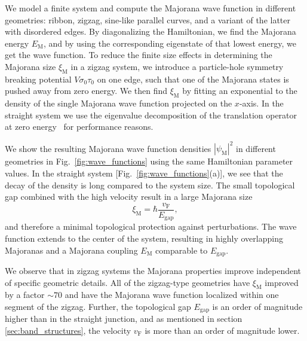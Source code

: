 \documentclass[english, twocolumn, 10pt, aps, superscriptaddress, floatfix, prb, citeautoscript]{revtex4-1}
\renewcommand{\comment}[2]{#2}
\begin{document}
\comment{We calculate the wave functions and find the Majorana lengths by fitting an exponential.}
We model a finite system and compute the Majorana wave function in different geometries: ribbon, zigzag, sine-like parallel curves, and a variant of the latter with disordered edges.
By diagonalizing the Hamiltonian, we find the Majorana energy $E_\textrm{M}$, and by using the corresponding eigenstate of that lowest energy, we get the wave function.
To reduce the finite size effects in determining the Majorana size $\xi_\textrm{M}$ in a zigzag system, we introduce a particle-hole symmetry breaking potential $V \sigma_0 \tau_0$ on one edge, such that one of the Majorana states is pushed away from zero energy.
We then find $\xi_\textrm{M}$ by fitting an exponential to the density of the single Majorana wave function projected on the $x$-axis.
In the straight system we use the eigenvalue decomposition of the translation operator at zero energy~\cite{Nijholt2015} for performance reasons.

\comment{In a straight system, the Majoranas are very poorly localized because of small gap and high velocity}
We show the resulting Majorana wave function densities $\left| \psi_\textrm{M} \right|^2$ in different geometries in Fig.~\ref{fig:wave_functions} using the same Hamiltonian parameter values.
In the straight system [Fig.~\ref{fig:wave_functions}(a)], we see that the decay of the density is long compared to the system size.
The small topological gap combined with the high velocity result in a large Majorana size
\begin{equation}
\label{eq:xi_M}
\xi_\textrm{M}=\hbar \frac{v_\textrm{F}}{E_\textrm{gap}},
\end{equation}
and therefore a minimal topological protection against perturbations.
The wave function extends to the center of the system, resulting in highly overlapping Majoranas and a Majorana coupling $E_\textrm{M}$ comparable to $E_\textrm{gap}$.

\comment{In a zigzag geometry Majoranas are localized within one segment of zigzag independent of details}
We observe that in zigzag systems the Majorana properties improve independent of specific geometric details.
All of the zigzag-type geometries have $\xi_\textrm{M}$ improved by a factor $\sim 70$ and have the Majorana wave function localized within one segment of the zigzag.
Further, the topological gap $E_\textrm{gap}$ is an order of magnitude higher than in the straight junction, and as mentioned in section \ref{sec:band_structures}, the velocity $v_\textrm{F}$ is more than an order of magnitude lower.
\end{document}
